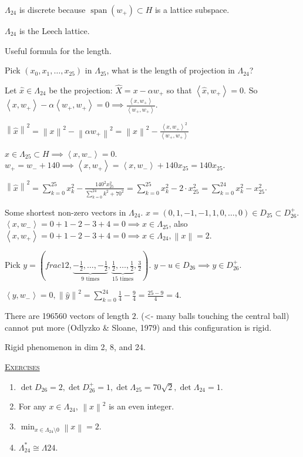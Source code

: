 \documentclass{report}
\newcommand{\inner}[2]{\left\langle #1, #2\right\rangle}
\newcommand{\norm}[1]{\left\| #1 \right\|}
\newcommand{\fancyem}[1]{\underline{\textsc{#1}}}
\theoremstyle{definition}
\theoremstyle{remark}
\numberwithin{equation}{section}
\begin{document}
$\Lambda_{24}$ is discrete because $\operatorname{span}(w_+) \subset H$ is a lattice subspace.

$\Lambda_{24}$ is the Leech lattice.

Useful formula for the length.

Pick $(x_0, x_1, \ldots, x_25)$ in $\Lambda_{25}$, what is the length of projection in $\Lambda_{24}$?

Let $\widehat{x} \in \Lambda_{24}$ be the projection: $\widehat{X} = x - \alpha w_+$ so that $\inner{\widehat{x}}{w_+} = 0$. So $\inner{x}{w_+} - \alpha\inner{w_+}{w_+} = 0 \implies \frac{\inner{x}{w_+}}{\inner{w_+}{w_+}}$.

$\norm{\widehat{x}}^2 = \norm{x}^2 - \norm{\alpha w_+}^2 = \norm{x}^2 - \frac{\inner{x}{w_+}^2}{\inner{w_+}{w_+}}$

$x \in \Lambda_{25} \subset H \implies \inner{x}{w_-} = 0$. $w_+ = w_- + 140 \implies \inner{x}{w_+} = \inner{x}{w_-} + 140 x_{25} = 140 x_{25}$.

$\norm{\widehat{x}}^2 = \sum_{k=0}^{25} x_k^2 - \frac{140^2x^2_{25}}{\sum_{k=0}^{24} k^2 + 70^2} = \sum_{k=0}^{25} x_k^2 - 2 \cdot x^2_{25} = \sum_{k=0}^{24}x_k^2  - x_{25}^2$.


Some shortest non-zero vectors in $\Lambda_{24}$.
$x = (0, 1, -1, -1, 1, 0, \ldots, 0) \in D_{25} \subset D_{26}^+$.
$\inner{x}{w_-} = 0 + 1 - 2 - 3 + 4  = 0 \implies x \in \Lambda_{25}$, also 
$\inner{x}{w_+} = 0 + 1 - 2 - 3 + 4  = 0 \implies x \in \Lambda_{24}, \norm{x} = 2$.

Pick $y = \left(frac{1}{2}, \underbrace{-\frac{1}{2}, \ldots, -\frac{1}{2}}_{9 \text{ times}}, \underbrace{\frac{1}{2}, \ldots, \frac{1}{2}}_{15 \text{ times}}, \frac{3}{2}\right)$. $y - u \in D_{26} \implies y \in D_{26}^+$.

$\inner{y}{w_-} = 0, \norm{\widehat{y}}^2 = \sum_{k=0}^{24} \frac{1}{4} - \frac{9}{4} = \frac{25 - 9}{4} = 4$.

There are 196560 vectors of length $2$. (<- many balls touching the central ball)
cannot put more (Odlyzko \& Sloane, 1979) and this configuration is rigid.

Rigid phenomenon in dim 2, 8, and 24.

\fancyem{Exercises}
\begin{enumerate}
    \item $\det D_{26} = 2, \det D_{26}^+ = 1, \det \Lambda_{25} = 70\sqrt{2}, \det \Lambda_{24} = 1$.
    \item For any $x \in \Lambda_{24}$, $\norm{x}^2$ is an even integer.
    \item $\min_{x \in \Lambda_{24} \setminus 0} \norm{x} = 2$.
    \item $\Lambda^*_{24} \cong \Lambda 24$.
\end{enumerate}
\end{document}
